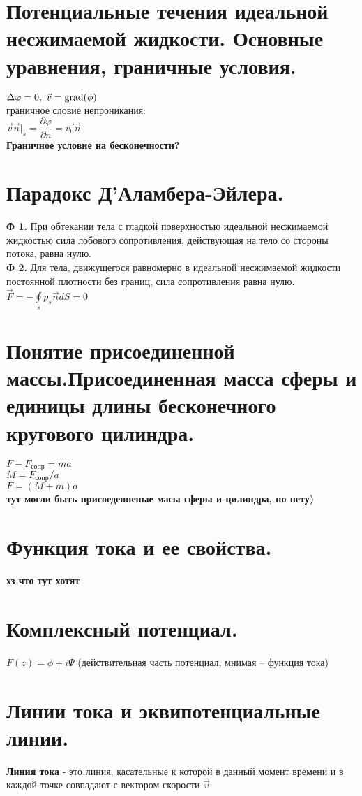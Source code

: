 \begin{multicols*}{4}
		\section{Потенциальные течения идеальной несжимаемой жидкости. Основные уравнения, граничные условия.}
		$\Delta \varphi=0,~\vec{v}=\operatorname{grad}(\phi)$ \\
		граничное словие непроникания: \\
		$\vec{v}\vec{n}|_s=\dfrac{\partial\varphi}{\partial n}=\vec{v_0}\vec{n}$ \\
		\textbf{Граничное условие на бесконечности?}
		
		\section{Парадокс Д’Аламбера-Эйлера.}
		\textbf{Ф 1.} При обтекании тела с гладкой поверхностью идеальной
		несжимаемой жидкостью сила лобового сопротивления, действующая на тело
		со стороны потока, равна нулю. \\
		\textbf{Ф 2.} Для тела, движущегося равномерно в идеальной несжимаемой жидкости постоянной плотности без границ, сила сопротивления равна
		нулю.\\
		$\vec{F}=-\oint\limits_sp_s\vec{n}dS=0$
		
		\section{Понятие присоединенной массы.Присоединенная масса сферы и единицы длины бесконечного кругового цилиндра.}
		$F-F_\text{сопр}=ma$ \\
		$M=F_\text{сопр}/a$ \\
		$F=(M+m)a$ \\ 
		\textbf{тут могли быть присоеденненые масы сферы и цилиндра, но нету)}
		
		\section{Функция тока и ее свойства.}
		\textbf{хз что тут хотят}
		
		\section{Комплексный потенциал.}
		$F(z)=\phi+i\Psi$ (действительная часть
		потенциал, мнимая – функция тока)
		
		\section{Линии тока и эквипотенциальные линии.}
		\textbf{Линия тока} - это линия, касательные к которой в данный момент времени и
		в каждой точке совпадают с вектором скорости  $\vec{v}$ \\
		

\end{multicols*}
